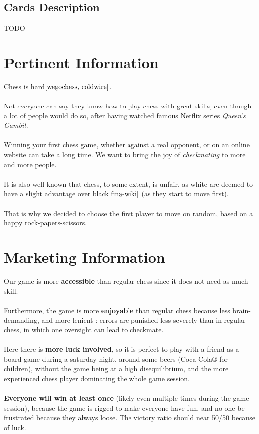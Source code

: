 \documentclass[12pt]{article}
\begin{document}
        \subsection{Cards Description}
            TODO
    
    \section{Pertinent Information}
        Chess is hard$\cite{wegochess, coldwire}$.
        \\\\Not everyone can say they know how to play chess with great skills, even though a lot of people would do so, after having watched famous Netflix series \textit{Queen's Gambit}.
        \\\\Winning your first chess game, whether against a real opponent, or on an online website can take a long time. We want to bring the joy of \textit{checkmating} to more and more people.
        \\\\It is also well-known that chess, to some extent, is unfair, as white are deemed to have a slight advantage over black$\cite{fma-wiki}$  (as they start to move first).
        \\\\That is why we decided to choose the first player to move on random, based on a happy rock-papers-scissors.
    
    \section{Marketing Information}
        Our game is more \textbf{accessible} than regular chess since it does not need as much skill.
        \\\\Furthermore, the game is more \textbf{enjoyable} than regular chess because less brain-demanding, and more lenient : errors are punished less severely than in regular chess, in which one oversight can lead to checkmate.
        \\\\Here there is \textbf{more luck involved}, so it is perfect to play with a friend as a board game during a saturday night, around some beers (Coca-Cola® for children), without the game being at a high disequilibrium, and the more experienced chess player dominating the whole game session.
        \\\\\textbf{Everyone will win at least once} (likely even multiple times during the game session), because the game is rigged to make everyone have fun, and no one be frustrated because they always loose. The victory ratio should near 50/50 because of luck.
\end{document}
